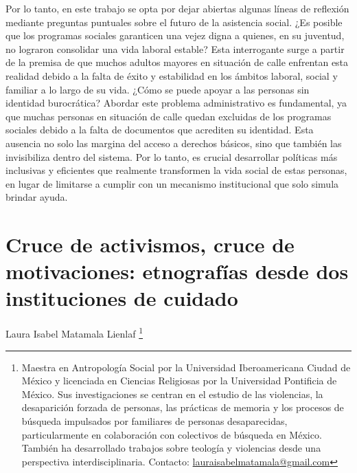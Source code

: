 \documentclass[
  spanish,
  11pt,
  a4paper,
]{scrbook}
\begin{document}
Por lo tanto, en este trabajo se opta por dejar abiertas algunas líneas
de reflexión mediante preguntas puntuales sobre el futuro de la
asistencia social. ¿Es posible que los programas sociales garanticen una
vejez digna a quienes, en su juventud, no lograron consolidar una vida
laboral estable? Esta interrogante surge a partir de la premisa de que
muchos adultos mayores en situación de calle enfrentan esta realidad
debido a la falta de éxito y estabilidad en los ámbitos laboral, social
y familiar a lo largo de su vida. ¿Cómo se puede apoyar a las personas
sin identidad burocrática? Abordar este problema administrativo es
fundamental, ya que muchas personas en situación de calle quedan
excluidas de los programas sociales debido a la falta de documentos que
acrediten su identidad. Esta ausencia no solo las margina del acceso a
derechos básicos, sino que también las invisibiliza dentro del sistema.
Por lo tanto, es crucial desarrollar políticas más inclusivas y
eficientes que realmente transformen la vida social de estas personas,
en lugar de limitarse a cumplir con un mecanismo institucional que solo
simula brindar ayuda.

\printbibliography[heading=subbibliography, title={Referencias Bibliográficas}]


\chapter{Cruce de activismos, cruce de motivaciones: etnografías desde
dos instituciones de
cuidado}\label{cruce-de-activismos-cruce-de-motivaciones-etnografuxedas-desde-dos-instituciones-de-cuidado}

\begin{flushright}
\Large Laura Isabel Matamala Lienlaf \footnote{Maestra en Antropología Social por la Universidad Iberoamericana Ciudad de México y licenciada en Ciencias Religiosas por la Universidad Pontificia de México. Sus investigaciones se centran en el estudio de las violencias, la desaparición forzada de personas, las prácticas de memoria y los procesos de búsqueda impulsados por familiares de personas desaparecidas, particularmente en colaboración con colectivos de búsqueda en México. También ha desarrollado trabajos sobre teología y violencias desde una perspectiva interdisciplinaria. Contacto: \href{lauraisabelmatamala@gmail.com}{lauraisabelmatamala@gmail.com}}
\end{flushright}
\end{document}
